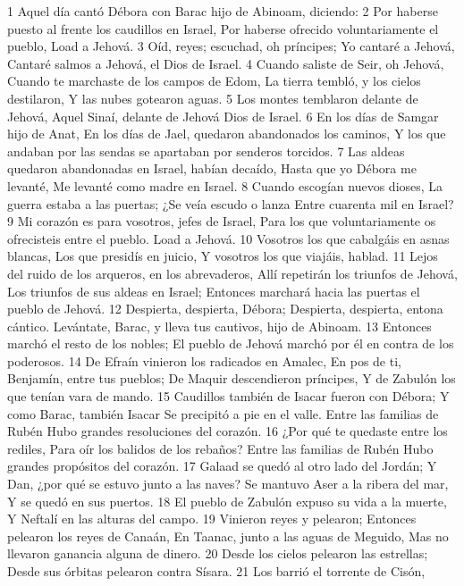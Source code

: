 1 Aquel día cantó Débora con Barac hijo de Abinoam, diciendo:
2 Por haberse puesto al frente los caudillos en Israel,
Por haberse ofrecido voluntariamente el pueblo,
Load a Jehová.
3 Oíd, reyes; escuchad, oh príncipes;
Yo cantaré a Jehová,
Cantaré salmos a Jehová, el Dios de Israel.
4 Cuando saliste de Seir, oh Jehová,
Cuando te marchaste de los campos de Edom,
La tierra tembló, y los cielos destilaron,
Y las nubes gotearon aguas. 
5 Los montes temblaron delante de Jehová,
Aquel Sinaí, delante de Jehová Dios de Israel. 
6 En los días de Samgar hijo de Anat,
En los días de Jael, quedaron abandonados los caminos,
Y los que andaban por las sendas se apartaban por senderos torcidos.
7 Las aldeas quedaron abandonadas en Israel, habían decaído,
Hasta que yo Débora me levanté,
Me levanté como madre en Israel. 
8 Cuando escogían nuevos dioses,
La guerra estaba a las puertas;
¿Se veía escudo o lanza
Entre cuarenta mil en Israel? 
9 Mi corazón es para vosotros, jefes de Israel,
Para los que voluntariamente os ofrecisteis entre el pueblo.
Load a Jehová.
10 Vosotros los que cabalgáis en asnas blancas,
Los que presidís en juicio,
Y vosotros los que viajáis, hablad.
11 Lejos del ruido de los arqueros, en los abrevaderos,
Allí repetirán los triunfos de Jehová,
Los triunfos de sus aldeas en Israel;
Entonces marchará hacia las puertas el pueblo de Jehová.
12 Despierta, despierta, Débora;
Despierta, despierta, entona cántico.
Levántate, Barac, y lleva tus cautivos, hijo de Abinoam.
13 Entonces marchó el resto de los nobles;
El pueblo de Jehová marchó por él en contra de los poderosos.
14 De Efraín vinieron los radicados en Amalec,
En pos de ti, Benjamín, entre tus pueblos;
De Maquir descendieron príncipes,
Y de Zabulón los que tenían vara de mando.
15 Caudillos también de Isacar fueron con Débora;
Y como Barac, también Isacar
Se precipitó a pie en el valle.
Entre las familias de Rubén
Hubo grandes resoluciones del corazón.
16 ¿Por qué te quedaste entre los rediles,
Para oír los balidos de los rebaños?
Entre las familias de Rubén
Hubo grandes propósitos del corazón. 
17 Galaad se quedó al otro lado del Jordán;
Y Dan, ¿por qué se estuvo junto a las naves?
Se mantuvo Aser a la ribera del mar,
Y se quedó en sus puertos.
18 El pueblo de Zabulón expuso su vida a la muerte,
Y Neftalí en las alturas del campo.
19 Vinieron reyes y pelearon;
Entonces pelearon los reyes de Canaán,
En Taanac, junto a las aguas de Meguido,
Mas no llevaron ganancia alguna de dinero.
20 Desde los cielos pelearon las estrellas;
Desde sus órbitas pelearon contra Sísara.
21 Los barrió el torrente de Cisón,

